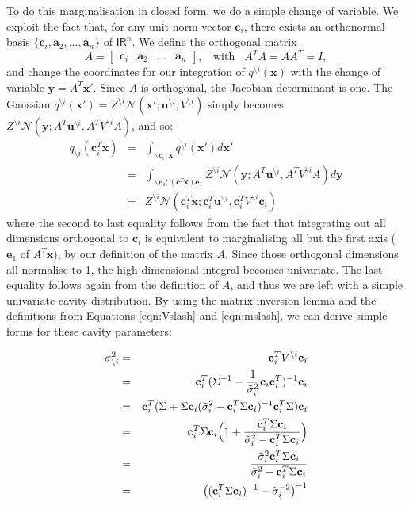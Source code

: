 \documentclass[twoside,11pt]{article}
\def\x{{\mathbf x}}
\def\y{{\mathbf y}}
\def\c{{\mathbf c}}
\def\e{{\mathbf e}}
\def\u{{\mathbf u}}
\def\a{{\mathbf a}}
\newcommand{\reals}{\mathsf{I\!R}}
\newcommand{\wo}{\setminus}
\begin{document}
To do this marginalisation in closed form, we do a simple change of variable. We exploit the fact that, for any unit norm vector $\c_i$, there exists an orthonormal basis $\{\c_i, \a_2,...,\a_n\}$ of $\reals^n$.  We define the orthogonal matrix
\begin{equation}
A = \begin{bmatrix} \c_i & \a_2 & \hdots & \a_n  \end{bmatrix}, ~~~~\mathrm{with}~~~~  A^TA = AA^T = I,
\end{equation}
and change the coordinates for our integration of $q^{\wo i}(\x)$ with the change of variable $\y = A^T \x'$. Since $A$ is orthogonal, the Jacobian determinant is one. The Gaussian $q^{\wo i}(\x')= Z^{\wo i} \mathcal{N}(\x'; \u^{\wo i},V^{\wo i})$ simply becomes $Z^{\wo i} \mathcal{N}(\y; A^T \u^{\wo i},A^T V^{\wo i} A)$, and so:
\begin{eqnarray}
q_{\wo i}(\c_i^T\x) & = & \int_{\backslash \c_i;\x} q^{\wo i}(\x') d\x' \\
& = & \int_{\backslash \e_1;(\c^T\x)\e_1}  Z^{\wo i} \mathcal{N}(\y; A^T \u^{\wo i},A^T V^{\wo i} A) d\y \\
& = & Z^{\wo i} \mathcal{N}(\c_i^T \x; \c_i^T\u^{\backslash i} , \c_i^TV^{\backslash i}\c_i)
\end{eqnarray}
where the second to last equality follows from the fact that integrating out all dimensions orthogonal to $\c_i$ is equivalent to marginalising all but the first axis ($\e_1$ of $A^T\x$), by our definition of the matrix $A$.  Since those orthogonal dimensions all normalise to 1, the high dimensional integral becomes univariate.  The last equality follows again from the definition of $A$, and thus we are left with a simple univariate cavity distribution.  By using the matrix inversion lemma and the definitions from Equations \ref{eqn:Vslash} and \ref{eqn:mslash}, we can derive simple  forms for these cavity parameters:

\begin{eqnarray}
\sigma_{\wo i}^{2} & = &  \c_i^TV^{\backslash i}\c_i \\
& = & \c_i^T(\Sigma^{-1}  - \frac{1}{\tilde{\sigma}_i^2} \c_i\c_i^T)^{-1}\c_i \\
& = & \c_i^T(\Sigma + \Sigma \c_i ( \tilde{\sigma}_i^{2}  - \c_i^T \Sigma \c_i )^{-1} \c_i^T \Sigma) \c_i \\
& = & \c_i^T\Sigma\c_i\Bigl( 1 +  \frac{ \c_i^T \Sigma \c_i }{ \tilde{\sigma}_i^{2}  - \c_i^T \Sigma \c_i }\Bigr)\\
& = & \frac{\tilde{\sigma}_i^{2}\c_i^T\Sigma\c_i}{\tilde{\sigma}_i^{2}  - \c_i^T \Sigma \c_i }\\
& = & \bigl( (\c_i^T\Sigma \c_i)^{-1} - \tilde{\sigma}^{-2}_i\bigr)^{-1}
\end{eqnarray}
\end{document}
